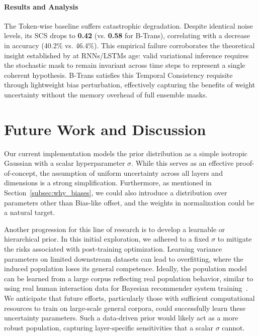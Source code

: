 \documentclass[11pt]{article}
\begin{document}
\paragraph{Results and Analysis} 
The Token-wise baseline suffers catastrophic degradation. Despite identical noise levels, its SCS drops to \textbf{0.42} (vs. \textbf{0.58} for B-Trans), correlating with a decrease in accuracy (40.2\% vs. 46.4\%). This empirical failure corroborates the theoretical insight established by \citet{gal2016dropout} at RNNs/LSTMs age: valid variational inference requires the stochastic mask to remain invariant across time steps to represent a single coherent hypothesis. B-Trans satisfies this Temporal Consistency requisite through lightweight bias perturbation, effectively capturing the benefits of weight uncertainty without the memory overhead of full ensemble masks.






\section{Future Work and Discussion}
\label{sec:future-work}

Our current implementation models the prior distribution as a simple isotropic Gaussian with a scalar hyperparameter $\sigma$. While this serves as an effective proof-of-concept, the assumption of uniform uncertainty across all layers and dimensions is a strong simplification. Furthermore, as mentioned in Section~\ref{subsec:why_biases}, we could also introduce a distribution over parameters other than Bias-like offset, and the weights in normalization could be a natural target.

Another progression for this line of research is to develop a learnable or hierarchical prior. In this initial exploration, we adhered to a fixed $\sigma$ to mitigate the risks associated with post-training optimization. 
Learning variance parameters on limited downstream datasets can lead to overfitting, where the induced population loses its general competence. 
Ideally, the population model can be learned from a large corpus reflecting real population behavior, similar to using real human interaction data for Bayesian recommender system training~\cite{zhang2007efficient}. 
We anticipate that future efforts, particularly those with sufficient computational resources to train on large-scale general corpora, could successfully learn these uncertainty parameters. Such a data-driven prior would likely act as a more robust population, capturing layer-specific sensitivities that a scalar $\sigma$ cannot.
\end{document}
